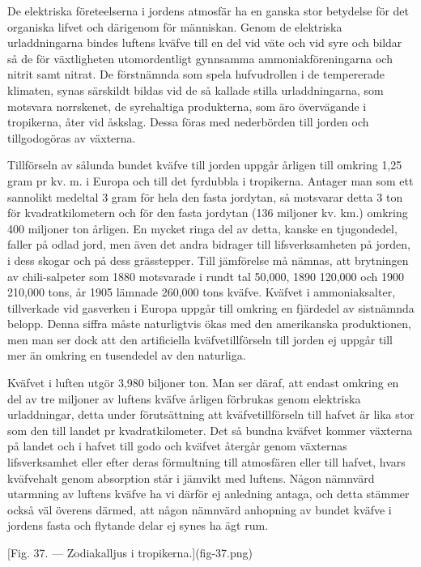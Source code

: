 \documentclass[a4paper, 12pt, oneside, swedish]{article}
\begin{document}
De elektriska företeelserna i jordens atmosfär ha en ganska stor betydelse för det organiska lifvet och därigenom för människan. Genom de elektriska urladdningarna bindes luftens kväfve till en del vid väte och vid syre och bildar så de för växtligheten utomordentligt gynnsamma ammoniakföreningarna och nitrit samt nitrat. De förstnämnda som spela hufvudrollen i de tempererade klimaten, synas särskildt bildas vid de så kallade stilla urladdningarna, som motsvara norrskenet, de syrehaltiga produkterna, som äro övervägande i tropikerna, åter vid åskslag. Dessa föras med nederbörden till jorden och tillgodogöras av växterna.

Tillförseln av sålunda bundet kväfve till jorden uppgår årligen till omkring 1,25 gram pr kv. m. i Europa och till det fyrdubbla i tropikerna. Antager man som ett sannolikt medeltal 3 gram för hela den fasta jordytan, så motsvarar detta 3 ton för kvadratkilometern och för den fasta jordytan (136 miljoner kv. km.) omkring 400 miljoner ton årligen. En mycket ringa del av detta, kanske en tjugondedel, faller på odlad jord, men även det andra bidrager till lifsverksamheten på jorden, i dess skogar och på dess grässtepper. Till jämförelse må nämnas, att brytningen av chili-salpeter som 1880 motsvarade i rundt tal 50,000, 1890 120,000 och 1900 210,000 tons, år 1905 lämnade 260,000 tons kväfve. Kväfvet i ammoniaksalter, tillverkade vid gasverken i Europa uppgår till omkring en fjärdedel av sistnämnda belopp. Denna siffra måste naturligtvis ökas med den amerikanska produktionen, men man ser dock att den artificiella kväfvetillförseln till jorden ej uppgår till mer än omkring en tusendedel av den naturliga.

Kväfvet i luften utgör 3,980 biljoner ton. Man ser däraf, att endast omkring en del av tre miljoner av luftens kväfve årligen förbrukas genom elektriska urladdningar, detta under förutsättning att kväfvetillförseln till hafvet är lika stor som den till landet pr kvadratkilometer. Det så bundna kväfvet kommer växterna på landet och i hafvet till godo och kväfvet återgår genom växternas lifsverksamhet eller efter deras förmultning till atmosfären eller till hafvet, hvars kväfvehalt genom absorption står i jämvikt med luftens. Någon nämnvärd utarmning av luftens kväfve ha vi därför ej anledning antaga, och detta stämmer också väl överens därmed, att någon nämnvärd anhopning av bundet kväfve i jordens fasta och flytande delar ej synes ha ägt rum.

[Fig. 37. --- Zodiakalljus i tropikerna.](fig-37.png)
\end{document}
